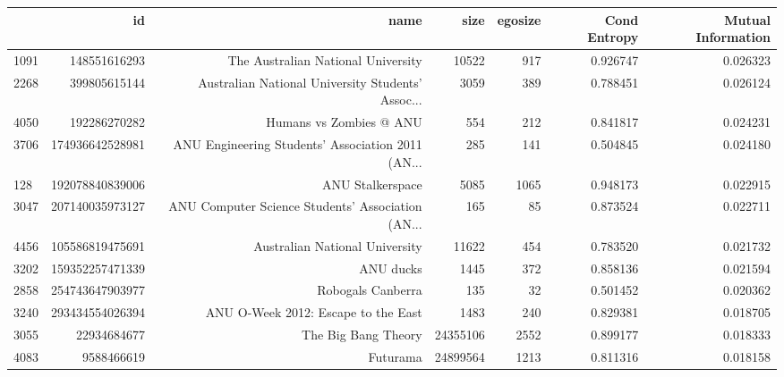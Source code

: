 \cleardoublepage
\begin{table}
\begin{tabular}{| >{\small}l | >{\small}r | >{\small}r | >{\small}r | >{\small}r | >{\small}r |>{\small}r |}
\hline
{} &               id &                                               name &      size &  egosize &   Cond Entropy &  Mutual Information \\
\hline
1091 &     148551616293 &                 The Australian National University &     10522 &      917 &             0.926747 &            0.026323 \\
2268 &     399805615144 &  Australian National University Students' Assoc... &      3059 &      389 &             0.788451 &            0.026124 \\
4050 &     192286270282 &                            Humans vs Zombies @ ANU &       554 &      212 &             0.841817 &            0.024231 \\
3706 &  174936642528981 &  ANU Engineering Students' Association 2011 (AN... &       285 &      141 &             0.504845 &            0.024180 \\
128  &  192078840839006 &                                   ANU Stalkerspace &      5085 &     1065 &             0.948173 &            0.022915 \\
3047 &  207140035973127 &  ANU Computer Science Students' Association (AN... &       165 &       85 &             0.873524 &            0.022711 \\
4456 &  105586819475691 &                     Australian National University &     11622 &      454 &             0.783520 &            0.021732 \\
3202 &  159352257471339 &                                          ANU ducks &      1445 &      372 &             0.858136 &            0.021594 \\
2858 &  254743647903977 &                                  Robogals Canberra &       135 &       32 &             0.501452 &            0.020362 \\
3240 &  293434554026394 &                ANU O-Week 2012: Escape to the East &      1483 &      240 &             0.829381 &            0.018705 \\
3055 &      22934684677 &                                The Big Bang Theory &  24355106 &     2552 &             0.899177 &            0.018333 \\
4083 &       9588466619 &                                           Futurama &  24899564 &     1213 &             0.811316 &            0.018158 \\

\end{tabular}
\end{table}
